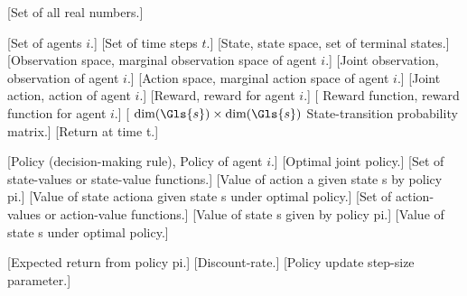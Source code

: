 
[Set of all real numbers.]


[Set of agents \(i\).]
[Set of time steps \(t\).]
[State, state space, set of terminal states.]
[Observation space, marginal observation space of agent \(i\).]
[Joint observation, observation of agent \(i\).]
[Action space, marginal action space of agent \(i\).]
[Joint action, action of agent \(i\).]
[Reward, reward for agent \(i\).]
[
    Reward function, reward function for agent \(i\).]
[
    \(\text{dim}(\Gls{s})\times\text{dim}(\Gls{s})\) State-transition probability matrix.]
[Return at time \gls{t}.]


[Policy (decision-making rule), Policy of agent \(i\).]
[Optimal joint policy.]
[Set of state-values or state-value functions.]
[Value of action \gls{a} given state \gls{s} by policy \gls{pi}.]
[Value of state action\gls{a} given state \gls{s} under optimal policy.]
[Set of action-values or action-value functions.]
[Value of state \gls{s} given by policy \gls{pi}.]
[Value of state \gls{s} under optimal policy.]


[Expected return from policy \gls{pi}.]
[Discount-rate.]
[Policy update step-size parameter.]



